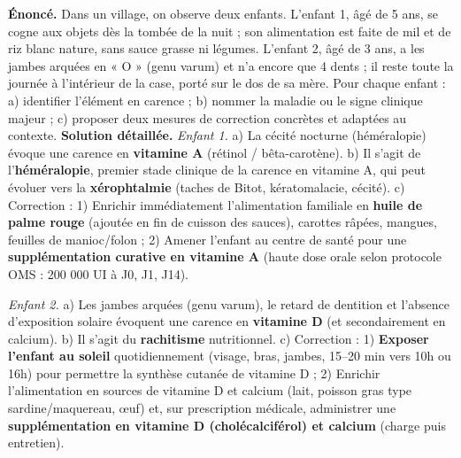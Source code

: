 \documentclass[11pt]{article}
\begin{document}
\begin{exoresolu}
\textbf{Énoncé.} Dans un village, on observe deux enfants. L'enfant 1, âgé de 5 ans, se cogne aux objets dès la tombée de la nuit ; son alimentation est faite de mil et de riz blanc nature, sans sauce grasse ni légumes. L'enfant 2, âgé de 3 ans, a les jambes arquées en « O » (genu varum) et n'a encore que 4 dents ; il reste toute la journée à l'intérieur de la case, porté sur le dos de sa mère. Pour chaque enfant : a) identifier l'élément en carence ; b) nommer la maladie ou le signe clinique majeur ; c) proposer deux mesures de correction concrètes et adaptées au contexte.
\tcblower
\textbf{Solution détaillée.}
\emph{Enfant 1.} a) La cécité nocturne (héméralopie) évoque une carence en \textbf{vitamine A} (rétinol / bêta-carotène). b) Il s'agit de l'\textbf{héméralopie}, premier stade clinique de la carence en vitamine A, qui peut évoluer vers la \textbf{xérophtalmie} (taches de Bitot, kératomalacie, cécité). c) Correction : 1) Enrichir immédiatement l'alimentation familiale en \textbf{huile de palme rouge} (ajoutée en fin de cuisson des sauces), carottes râpées, mangues, feuilles de manioc/folon ; 2) Amener l'enfant au centre de santé pour une \textbf{supplémentation curative en vitamine A} (haute dose orale selon protocole OMS : 200 000 UI à J0, J1, J14).

\emph{Enfant 2.} a) Les jambes arquées (genu varum), le retard de dentition et l'absence d'exposition solaire évoquent une carence en \textbf{vitamine D} (et secondairement en calcium). b) Il s'agit du \textbf{rachitisme} nutritionnel. c) Correction : 1) \textbf{Exposer l'enfant au soleil} quotidiennement (visage, bras, jambes, 15--20 min vers 10h ou 16h) pour permettre la synthèse cutanée de vitamine D ; 2) Enrichir l'alimentation en sources de vitamine D et calcium (lait, poisson gras type sardine/maquereau, œuf) et, sur prescription médicale, administrer une \textbf{supplémentation en vitamine D (cholécalciférol) et calcium} (charge puis entretien).
\end{exoresolu}
\end{document}
